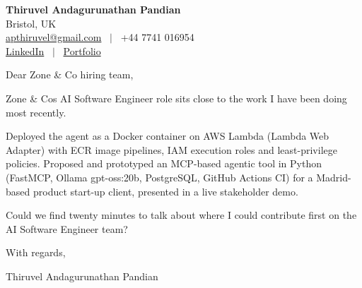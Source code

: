 \documentclass[11pt,a4paper]{article}
\begin{document}
\raggedright
\pagestyle{empty}

\begin{center}
    {\LARGE \color{linkblue} \textbf{Thiruvel Andagurunathan Pandian}}\\[0.2cm]
    Bristol, UK \\
    \href{mailto:apthiruvel@gmail.com}{apthiruvel@gmail.com} \ $|$ \ +44 7741 016954 \\
\href{https://www.linkedin.com/in/thiruvel-a-p/}{LinkedIn} \ $|$ \ \href{https://thiruvel-ap.github.io/PersonalPortfolio/}{Portfolio}
\end{center}

\vspace{0.4cm}

\noindent
Dear Zone \& Co hiring team,

Zone \& Co\textquotesingle{}s AI Software Engineer role sits close to the work I have been doing most recently.

Deployed the agent as a Docker container on AWS Lambda (Lambda Web Adapter) with ECR image pipelines, IAM execution roles and least-privilege policies. Proposed and prototyped an MCP-based agentic tool in Python (FastMCP, Ollama gpt-oss:20b, PostgreSQL, GitHub Actions CI) for a Madrid-based product start-up client, presented in a live stakeholder demo.

Could we find twenty minutes to talk about where I could contribute first on the AI Software Engineer team?

\vspace{0.5cm}

With regards,

Thiruvel Andagurunathan Pandian
\end{document}
